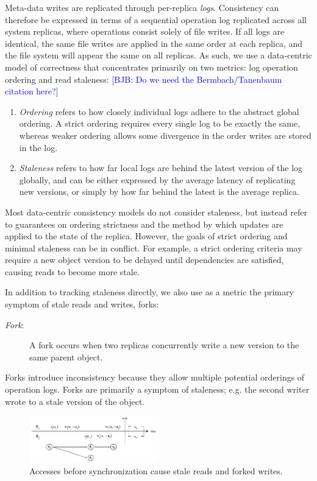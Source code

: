 \documentclass[10pt,conference,letterpaper]{IEEEtran}
\newcommand{\blue}[1]{{\textcolor{blue}{#1}}}
\newcommand{\bjb}[1]{[\blue{BJB: #1}]}
\begin{document}
Meta-data writes are replicated through per-replica \emph{logs}.
Consistency can therefore be expressed in terms of a sequential operation log replicated across all
system replicas, where operations consist solely of file writes.
If all logs are identical, the same file writes are applied in the same
order at each replica, and the file system will appear the same on all replicas.
As such, we use a {data-centric} model of
correctness that concentrates primarily on two metrics: log operation ordering and
read staleness: \bjb{Do we need the Bermbach/Tanenbaum citation here?}
\begin{enumerate}
\item \emph{Ordering} refers to how closely individual logs adhere to the abstract
  global ordering. A strict ordering requires every single log to be exactly the
  same, whereas weaker ordering allows some divergence in the order writes are stored in
  the log.
\item \emph{Staleness} refers to how far local logs are behind the latest version of the log globally,
  and can be either expressed by the average latency of replicating new versions, or
  simply by how far behind the latest is the average replica.
\end{enumerate}

Most data-centric consistency models do not consider staleness, but instead refer to
guarantees on ordering strictness and the method by which updates are applied to the state
of the replica.
However, the goals of strict ordering and minimal staleness can be in conflict. For
example, a strict ordering criteria may require a new object version to be delayed until
dependencies are satisfied, causing reads to become more stale.

In addition to tracking staleness directly, we also use as a metric the primary symptom of stale
reads and writes, forks:
\begin{description}
    \item[\textit{Fork}:] A fork occurs when two replicas concurrently write a new version to the same parent object.
\end{description}
Forks introduce inconsistency because they allow multiple potential orderings of operation
logs.
Forks are primarily a symptom of staleness; e.g. the second writer wrote to
a stale version of the object.

\begin{figure}[t]
    \centering
    \includegraphics[width=0.5\textwidth]{figures/forks}
    \caption{Accesses before synchronization cause stale reads and forked writes.}
    \label{fig:forks}
\end{figure}
\end{document}
